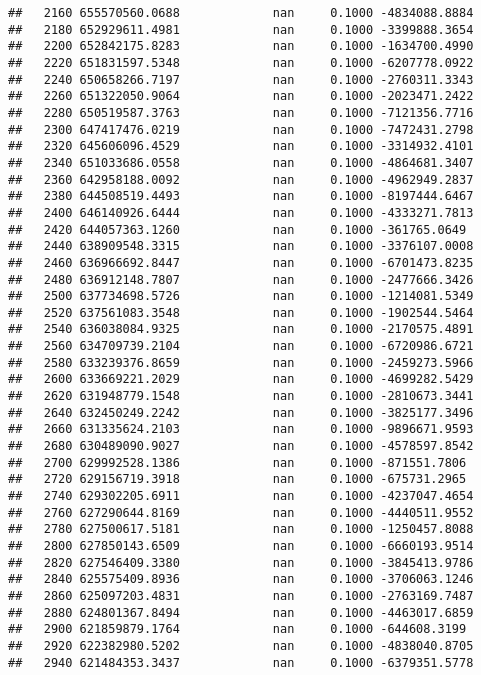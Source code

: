 \documentclass[
]{article}
\begin{document}
\begin{verbatim}
##   2160 655570560.0688             nan     0.1000 -4834088.8884
##   2180 652929611.4981             nan     0.1000 -3399888.3654
##   2200 652842175.8283             nan     0.1000 -1634700.4990
##   2220 651831597.5348             nan     0.1000 -6207778.0922
##   2240 650658266.7197             nan     0.1000 -2760311.3343
##   2260 651322050.9064             nan     0.1000 -2023471.2422
##   2280 650519587.3763             nan     0.1000 -7121356.7716
##   2300 647417476.0219             nan     0.1000 -7472431.2798
##   2320 645606096.4529             nan     0.1000 -3314932.4101
##   2340 651033686.0558             nan     0.1000 -4864681.3407
##   2360 642958188.0092             nan     0.1000 -4962949.2837
##   2380 644508519.4493             nan     0.1000 -8197444.6467
##   2400 646140926.6444             nan     0.1000 -4333271.7813
##   2420 644057363.1260             nan     0.1000 -361765.0649
##   2440 638909548.3315             nan     0.1000 -3376107.0008
##   2460 636966692.8447             nan     0.1000 -6701473.8235
##   2480 636912148.7807             nan     0.1000 -2477666.3426
##   2500 637734698.5726             nan     0.1000 -1214081.5349
##   2520 637561083.3548             nan     0.1000 -1902544.5464
##   2540 636038084.9325             nan     0.1000 -2170575.4891
##   2560 634709739.2104             nan     0.1000 -6720986.6721
##   2580 633239376.8659             nan     0.1000 -2459273.5966
##   2600 633669221.2029             nan     0.1000 -4699282.5429
##   2620 631948779.1548             nan     0.1000 -2810673.3441
##   2640 632450249.2242             nan     0.1000 -3825177.3496
##   2660 631335624.2103             nan     0.1000 -9896671.9593
##   2680 630489090.9027             nan     0.1000 -4578597.8542
##   2700 629992528.1386             nan     0.1000 -871551.7806
##   2720 629156719.3918             nan     0.1000 -675731.2965
##   2740 629302205.6911             nan     0.1000 -4237047.4654
##   2760 627290644.8169             nan     0.1000 -4440511.9552
##   2780 627500617.5181             nan     0.1000 -1250457.8088
##   2800 627850143.6509             nan     0.1000 -6660193.9514
##   2820 627546409.3380             nan     0.1000 -3845413.9786
##   2840 625575409.8936             nan     0.1000 -3706063.1246
##   2860 625097203.4831             nan     0.1000 -2763169.7487
##   2880 624801367.8494             nan     0.1000 -4463017.6859
##   2900 621859879.1764             nan     0.1000 -644608.3199
##   2920 622382980.5202             nan     0.1000 -4838040.8705
##   2940 621484353.3437             nan     0.1000 -6379351.5778

\end{verbatim}
\end{document}
